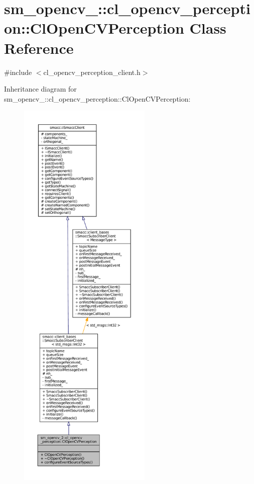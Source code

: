 \hypertarget{classsm__opencv__2_1_1cl__opencv__perception_1_1ClOpenCVPerception}{}\section{sm\+\_\+opencv\+\_\+:\+:cl\+\_\+opencv\+\_\+perception\+:\+:Cl\+Open\+C\+V\+Perception Class Reference}
\label{classsm__opencv__2_1_1cl__opencv__perception_1_1ClOpenCVPerception}


{\ttfamily \#include $<$cl\+\_\+opencv\+\_\+perception\+\_\+client.\+h$>$}



Inheritance diagram for sm\+\_\+opencv\+\_\+:\+:cl\+\_\+opencv\+\_\+perception\+:\+:Cl\+Open\+C\+V\+Perception\+:
\nopagebreak
\begin{figure}[H]
\begin{center}
\leavevmode
\includegraphics[height=550pt]{classsm__opencv__2_1_1cl__opencv__perception_1_1ClOpenCVPerception__inherit__graph}
\end{center}
\end{figure}


